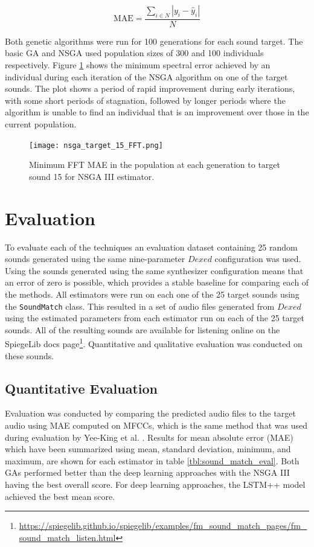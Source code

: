 \begin{equation}
    \text{MAE} = \frac{\sum_{i \in N}{|y_i - \hat{y}_i|}}{N}
\end{equation}

Both genetic algorithms were run for 100 generations for each sound target. The basic GA and NSGA used population sizes of 300 and 100 individuals respectively. Figure \ref{fig:nsga_fitness} shows the minimum spectral error achieved by an individual during each iteration of the NSGA algorithm on one of the target sounds. The plot shows a period of rapid improvement during early iterations, with some short periods of stagnation, followed by longer periods where the algorithm is unable to find an individual that is an improvement over those in the current population.


\begin{figure}[ht]
\begin{center}
\texttt{[image: nsga\_target\_15\_FFT.png]}
\caption{Minimum FFT MAE in the population at each generation to target sound 15 for NSGA III estimator.}
\label{fig:nsga_fitness}
\end{center}
\end{figure}

\section{Evaluation}
\label{sec:inverse-synth-eval}

To evaluate each of the techniques an evaluation dataset containing 25 random sounds generated using the same nine-parameter $Dexed$ configuration was used. Using the sounds generated using the same synthesizer configuration means that an error of zero is possible, which provides a stable baseline for comparing each of the methods. All estimators were run on each one of the 25 target sounds using the \texttt{SoundMatch} class. This resulted in a set of audio files generated from $Dexed$ using the estimated parameters from each estimator run on each of the 25 target sounds. All of the resulting sounds are available for listening online on the SpiegeLib docs page\footnote{\url{https://spiegelib.github.io/spiegelib/examples/fm_sound_match_pages/fm_sound_match_listen.html}}. Quantitative and qualitative evaluation was conducted on these sounds.

\subsection{Quantitative Evaluation}
Evaluation was conducted by comparing the predicted audio files to the target audio using MAE computed on MFCCs, which is the same method that was used during evaluation by Yee-King et al. \cite{yee2018automatic}. Results for mean absolute error (MAE) which have been summarized using mean, standard deviation, minimum, and maximum, are shown for each estimator in table \ref{tbl:sound_match_eval}. Both GAs performed better than the deep learning approaches with the NSGA III having the best overall score. For deep learning approaches, the LSTM++ model achieved the best mean score.

